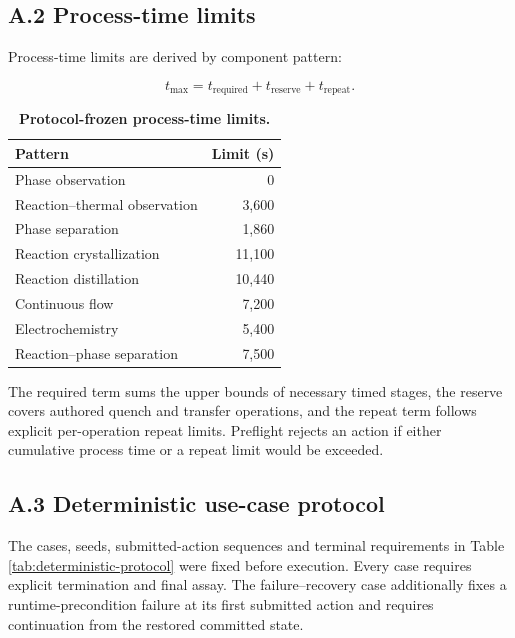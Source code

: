 \documentclass[10pt,twocolumn]{article}
\begin{document}
\subsection{A.2 Process-time limits}\label{a.2-process-time-limits}

Process-time limits are derived by component pattern:

\[
t_{\max}=t_{\mathrm{required}}+t_{\mathrm{reserve}}+t_{\mathrm{repeat}}.
\]
\begin{table}[H]
\centering
\small
\caption{\textbf{Protocol-frozen process-time limits.}}
\label{tab:process-time-limits}
\begin{tabularx}{\columnwidth}{@{}Yr@{}}
\toprule
Pattern & Limit (s) \\
\midrule
Phase observation & 0 \\
Reaction--thermal observation & 3,600 \\
Phase separation & 1,860 \\
Reaction crystallization & 11,100 \\
Reaction distillation & 10,440 \\
Continuous flow & 7,200 \\
Electrochemistry & 5,400 \\
Reaction--phase separation & 7,500 \\
\bottomrule
\end{tabularx}
\end{table}

The required term sums the upper bounds of necessary timed stages, the
reserve covers authored quench and transfer operations, and the repeat
term follows explicit per-operation repeat limits. Preflight rejects an
action if either cumulative process time or a repeat limit would be
exceeded.

\subsection{A.3 Deterministic use-case
protocol}\label{a.3-deterministic-use-case-protocol}

The cases, seeds, submitted-action sequences and terminal requirements
in Table \ref{tab:deterministic-protocol} were fixed before execution.
Every case requires explicit termination and final assay. The
failure--recovery case additionally fixes a runtime-precondition failure
at its first submitted action and requires continuation from the
restored committed state.
\end{document}
